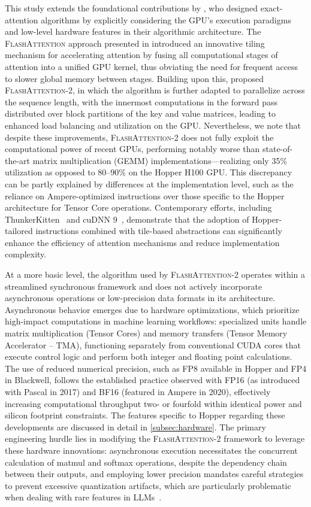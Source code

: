 This study extends the foundational contributions by \citet{dao2022flashattention}, who designed exact-attention algorithms by explicitly considering the GPU's execution paradigms and low-level hardware features in their algorithmic architecture. The \textsc{FlashAttention} approach presented in \citep{dao2022flashattention} introduced an innovative tiling mechanism for accelerating attention by fusing all computational stages of attention into a unified GPU kernel, thus obviating the need for frequent access to slower global memory between stages. Building upon this, \citet{dao2023flashattention2} proposed \textsc{FlashAttention-2}, in which the algorithm is further adapted to parallelize across the sequence length, with the innermost computations in the forward pass distributed over block partitions of the key and value matrices, leading to enhanced load balancing and utilization on the GPU. Nevertheless, we note that despite these improvements, \textsc{FlashAttention-2} does not fully exploit the computational power of recent GPUs, performing notably worse than state-of-the-art matrix multiplication (GEMM) implementations—realizing only 35\% utilization as opposed to 80–90\% on the Hopper H100 GPU. This discrepancy can be partly explained by differences at the implementation level, such as the reliance on Ampere-optimized instructions over those specific to the Hopper architecture for Tensor Core operations. Contemporary efforts, including ThunkerKitten~\citep{spector2024thunder} and cuDNN 9~\citep{cudnn9}, demonstrate that the adoption of Hopper-tailored instructions combined with tile-based abstractions can significantly enhance the efficiency of attention mechanisms and reduce implementation complexity.

At a more basic level, the algorithm used by \textsc{FlashAttention-2} operates within a streamlined synchronous framework and does not actively incorporate asynchronous operations or low-precision data formats in its architecture. Asynchronous behavior emerges due to hardware optimizations, which prioritize high-impact computations in machine learning workflows: specialized units handle matrix multiplication (Tensor Cores) and memory transfers (Tensor Memory Accelerator -- TMA), functioning separately from conventional CUDA cores that execute control logic and perform both integer and floating point calculations. The use of reduced numerical precision, such as FP8 available in Hopper and FP4 in Blackwell, follows the established practice observed with FP16 (as introduced with Pascal in 2017) and BF16 (featured in Ampere in 2020), effectively increasing computational throughput two- or fourfold within identical power and silicon footprint constraints. The features specific to Hopper regarding these developments are discussed in detail in \cref{subsec:hardware}. The primary engineering hurdle lies in modifying the \textsc{FlashAttention-2} framework to leverage these hardware innovations: asynchronous execution necessitates the concurrent calculation of matmul and softmax operations, despite the dependency chain between their outputs, and employing lower precision mandates careful strategies to prevent excessive quantization artifacts, which are particularly problematic when dealing with rare features in LLMs~\citep{dettmers2208llm, sun2024massive}.

